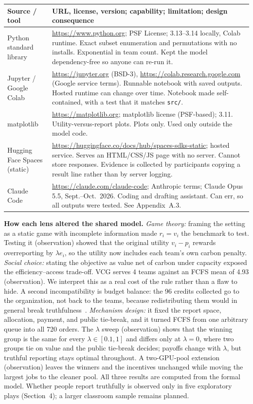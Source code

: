 {\footnotesize
\begin{tabularx}{\columnwidth}{@{}p{1.6cm}Y@{}}\toprule
\textbf{Source / tool}&\textbf{URL, license, version; capability; limitation; design consequence}\\\midrule
Python standard library&\url{https://www.python.org}; PSF License; 3.13--3.14 locally, Colab runtime. Exact subset enumeration and permutations with no installs. Exponential in team count. Kept the model dependency-free so anyone can re-run it.\\
Jupyter / Google Colab&\url{https://jupyter.org} (BSD-3), \url{https://colab.research.google.com} (Google service terms). Runnable notebook with saved outputs. Hosted runtime can change over time. Notebook made self-contained, with a test that it matches \texttt{src/}.\\
matplotlib&\url{https://matplotlib.org}; matplotlib license (PSF-based); 3.11. Utility-versus-report plots. Plots only. Used only outside the model code.\\
Hugging Face Spaces (static)&\url{https://huggingface.co/docs/hub/spaces-sdks-static}; hosted service. Serves an HTML/CSS/JS page with no server. Cannot store responses. Evidence is collected by participants copying a result line rather than by server logging.\\
Claude Code&\url{https://claude.com/claude-code}; Anthropic terms; Claude Opus 5.5, Sept.--Oct.~2026. Coding and drafting assistant. Can err, so all outputs were tested. See Appendix~A.3.\\\bottomrule
\end{tabularx}}

\textbf{How each lens altered the shared model.}
\emph{Game theory:} framing the setting as a static game with incomplete information made $r_i=v_i$ the benchmark to test. Testing it (observation) showed that the original utility $v_i-p_i$ rewards overreporting by $\lambda e_i$, so the utility now includes each team's own carbon penalty.
\emph{Social choice:} stating the objective as value net of carbon under capacity exposed the efficiency--access trade-off. VCG serves 4 teams against an FCFS mean of 4.93 (observation). We interpret this as a real cost of the rule rather than a flaw to hide. A second incompatibility is budget balance: the 96 credits collected go to the organization, not back to the teams, because redistributing them would in general break truthfulness~\cite{greenlaffont1977}.
\emph{Mechanism design:} it fixed the report space, allocation, payment, and public tie-break, and it turned FCFS from one arbitrary queue into all 720 orders. The $\lambda$ sweep (observation) shows that the winning group is the same for every $\lambda\in[0.1,1]$ and differs only at $\lambda=0$, where two groups tie on value and the public tie-break decides; payoffs change with $\lambda$, but truthful reporting stays optimal throughout. A two-GPU-pool extension (observation) leaves the winners and the incentives unchanged while moving the largest jobs to the cleaner pool.
All three results are computed from the formal model. Whether people report truthfully is observed only in five exploratory plays (Section~4); a larger classroom sample remains planned.


